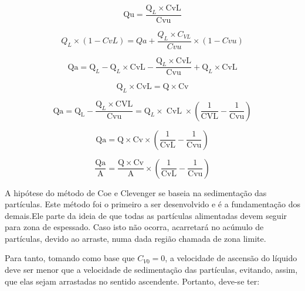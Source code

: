 \begin{equation}\label{key}
\mathrm{Qu}=\frac{\mathrm{Q}_{L} \times \mathrm{CvL}}{\mathrm{Cvu}}
\end{equation}

\begin{equation}\label{key}
Q_{L} \times(1-C v L)=Q a+\frac{Q_{L} \times C_{V L}}{C v u} \times(1-C v u)
\end{equation}

\begin{equation}\label{key}
\mathrm{Qa}=\mathrm{Q}_{L}-\mathrm{Q}_{L} \times \mathrm{CvL}-\frac{\mathrm{Q}_{L} \times \mathrm{CvL}}{\mathrm{Cvu}}+\mathrm{Q}_{L} \times \mathrm{CvL}
\end{equation}

\begin{equation}\label{key}
\mathrm{Q}_{L} \times \mathrm{CvL}=\mathrm{Q} \times \mathrm{Cv}
\end{equation}

\begin{equation}\label{key}
\mathrm{Qa}=\mathrm{Q}_{\mathrm{L}}-\frac{\mathrm{Q}_{L} \times \mathrm{CVL}}{\mathrm{Cvu}}=\mathrm{Q}_{L} \times \operatorname{CvL} \times\left(\frac{1}{\mathrm{CVL}}-\frac{1}{\mathrm{Cvu}}\right)
\end{equation}

\begin{equation}\label{key}
\mathrm{Qa}=\mathrm{Q} \times \mathrm{Cv} \times\left(\frac{1}{\mathrm{CvL}}-\frac{1}{\mathrm{Cvu}}\right)
\end{equation}

\begin{equation}\label{key}
\frac{\mathrm{Qa}}{\mathrm{A}}=\frac{\mathrm{Q} \times \mathrm{Cv}}{\mathrm{A}} \times\left(\frac{1}{\mathrm{CvL}}-\frac{1}{\mathrm{Cvu}}\right)
\end{equation}

A hipótese do método de Coe e Clevenger se baseia na sedimentação das partículas. Este método foi o primeiro a ser desenvolvido e é a fundamentação dos demais.Ele parte da ideia de que todas as partículas alimentadas devem seguir para zona de espessado. Caso isto não ocorra, acarretará no acúmulo de partículas, devido ao arraste, numa dada região chamada de zona limite.

Para tanto, tomando como base que $ C_{V0} = 0 $, a velocidade de ascensão do líquido deve ser menor que a velocidade de sedimentação das partículas, evitando, assim, que elas sejam arrastadas no sentido ascendente. Portanto, deve-se ter:



